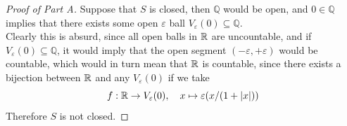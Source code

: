 \documentclass[../../main.tex]{subfiles}
\begin{document}
\begin{proof}[Proof of Part A]
    Suppose that $S$ is closed, then $\mathbb{Q}$ would be open, and $0\in\mathbb{Q}$ implies that there exists some open $\varepsilon$ ball $V_\varepsilon(0)\subseteq\mathbb{Q}$. \\
    
    Clearly this is absurd, since all open balls in $\mathbb{R}$ are uncountable, and if $V_\varepsilon(0)\subseteq\mathbb{Q}$, it would imply that the open segment $(-\varepsilon,+\varepsilon)$ would be countable, which would in turn mean that $\mathbb{R}$ is countable, since there exists a bijection between $\mathbb{R}$ and any $V_\varepsilon(0)$ if we take
    \[
        f:\mathbb{R}\to V_\varepsilon(0),\quad x\mapsto \varepsilon(x/(1+|x|))
    \]
    Therefore $S$ is not closed.
\end{proof}
\end{document}
